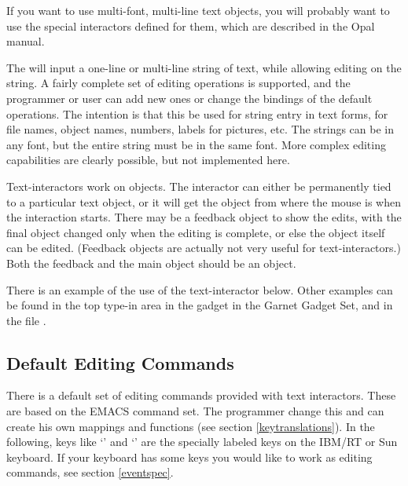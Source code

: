 If you want to use multi-font, multi-line text objects, you will probably
want to use the special interactors defined for them, which are described
in the Opal manual.

The  will input a one-line or multi-line string of text,
while allowing editing on the string.  A fairly complete set of editing
operations is supported, and the programmer or user can add new ones or
change the bindings of the default operations.
The intention is that this be used for string entry in text forms, for file
names, object names, numbers, labels for pictures, etc.  The strings can be
in any font, but the entire string must be in the same font.  More complex editing
capabilities are clearly possible, but not implemented here.

Text-interactors work on  objects.
The interactor can either be permanently tied to a particular text
object, or it will get the object from where the mouse is when the
interaction starts.  There may be a feedback object to show the edits, with
the final object changed only when the editing is complete, or else the
object itself can be edited.  (Feedback objects are actually not very
useful for text-interactors.)
Both the feedback and the main object should be an  object.

There is an example of the use of the text-interactor below.  Other
examples can be found in
the top type-in area in the  gadget in
the Garnet Gadget Set, and in the file .

\subsection{Default Editing Commands}
\label{defaulteditingcommands}
There is a default set of editing commands provided with text interactors.
These are based on the EMACS command set.  The programmer change this and
can create his own mappings and functions (see section \ref{keytranslations}).
In the following, keys like `' and `' are the
specially labeled keys on the IBM/RT or Sun keyboard.  If your keyboard has
some keys you would like to work as editing commands, see section \ref{eventspec}.

